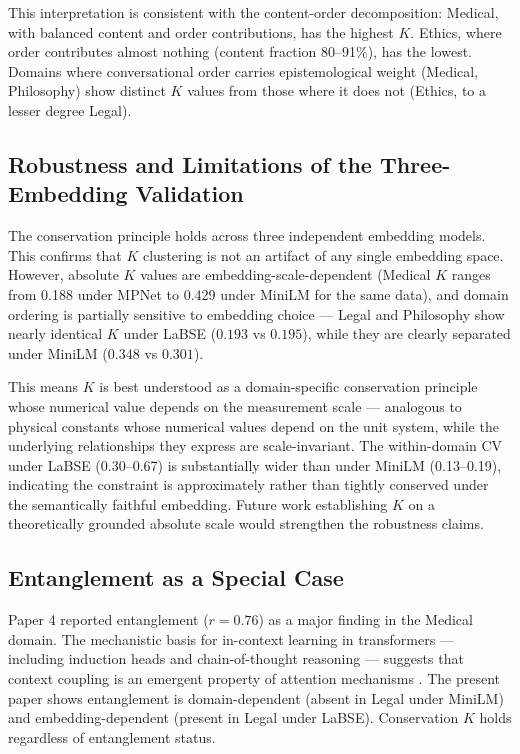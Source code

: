 \documentclass[11pt,a4paper]{article}
\begin{document}
This interpretation is consistent with the content-order decomposition: Medical, with
balanced content and order contributions, has the highest $K$. Ethics, where order
contributes almost nothing (content fraction 80--91\%), has the lowest. Domains where
conversational order carries epistemological weight (Medical, Philosophy) show distinct
$K$ values from those where it does not (Ethics, to a lesser degree Legal).

\subsection{Robustness and Limitations of the Three-Embedding Validation}

The conservation principle holds across three independent embedding models. This
confirms that $K$ clustering is not an artifact of any single embedding space. However,
absolute $K$ values are embedding-scale-dependent (Medical $K$ ranges from 0.188 under
MPNet to 0.429 under MiniLM for the same data), and domain ordering is partially
sensitive to embedding choice --- Legal and Philosophy show nearly identical $K$ under
LaBSE ($0.193$ vs $0.195$), while they are clearly separated under MiniLM
($0.348$ vs $0.301$).

This means $K$ is best understood as a domain-specific conservation principle whose
numerical value depends on the measurement scale --- analogous to physical constants
whose numerical values depend on the unit system, while the underlying relationships
they express are scale-invariant. The within-domain CV under LaBSE
(0.30--0.67) is substantially wider than under MiniLM (0.13--0.19), indicating the
constraint is approximately rather than tightly conserved under the semantically
faithful embedding. Future work establishing $K$ on a theoretically grounded absolute
scale would strengthen the robustness claims.

\subsection{Entanglement as a Special Case}

Paper 4 \citep{laxman2026d} reported entanglement ($r = 0.76$) as a major finding
in the Medical domain. The mechanistic basis for in-context learning in transformers ---
including induction heads \citep{olsson2022induction} and chain-of-thought reasoning
\citep{wei2022cot} --- suggests that context coupling is an emergent property of
attention mechanisms \citep{wei2022emergent}. The present paper shows entanglement is
domain-dependent (absent in Legal under MiniLM) and embedding-dependent (present in
Legal under LaBSE). Conservation $K$ holds regardless of entanglement status.
\end{document}
